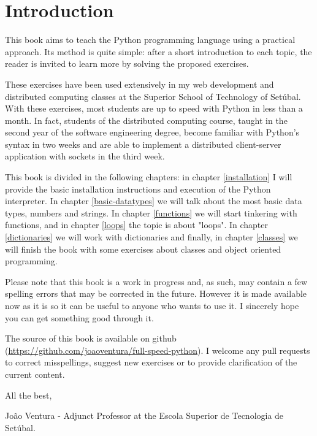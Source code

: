\chapter{Introduction}\label{introduction}

This book aims to teach the Python programming language using a practical approach. Its method is quite simple: after a short introduction to each topic, the reader is invited to learn more by solving the proposed exercises.

These exercises have been used extensively in my web development and distributed computing classes at the Superior School of Technology of Setúbal. With these exercises, most students are up to speed with Python in less than a month. In fact, students of the distributed computing course, taught in the second year of the software engineering degree, become familiar with Python's syntax in two weeks and are able to implement a distributed client-server application with sockets in the third week.

This book is divided in the following chapters: in chapter \ref{installation} I will provide the basic installation instructions and execution of the Python interpreter. In chapter \ref{basic-datatypes} we will talk about the most basic data types, numbers and strings. In chapter \ref{functions} we will start tinkering with functions, and in chapter \ref{loops} the topic is about "loops". In chapter \ref{dictionaries} we will work with dictionaries and finally, in chapter \ref{classes} we will finish the book with some exercises about classes and object oriented programming.

Please note that this book is a work in progress and, as such, may contain a few spelling errors that may be corrected in the future. However it is made available now as it is so it can be useful to anyone who wants to use it. I sincerely hope you can get something good through it.

The source of this book is available on github (\url{https://github.com/joaoventura/full-speed-python}). I welcome any pull requests to correct misspellings, suggest new exercises or to provide clarification of the current content.

All the best,

João Ventura - Adjunct Professor at the Escola Superior de Tecnologia de Setúbal.

